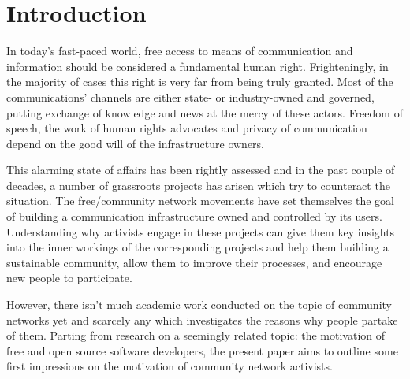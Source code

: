 \section{Introduction}

In today's fast-paced world, free access to means of communication and information should be considered a fundamental human right.
Frighteningly, in the majority of cases this right is very far from being truly granted.
Most of the communications' channels are either state- or industry-owned and governed, putting exchange of knowledge and news at the mercy of these actors.
Freedom of speech, the work of human rights advocates and privacy of communication depend on the good will of the infrastructure owners.

This alarming state of affairs has been rightly assessed and in the past couple of decades, a number of grassroots projects has arisen which try to counteract the situation.
The free/community network movements have set themselves the goal of building a communication infrastructure owned and controlled by its users.
Understanding why activists engage in these projects can give them key insights into the inner workings of the corresponding projects and help them building a sustainable community, allow them to improve their processes, and encourage new people to participate.

However, there isn't much academic work conducted on the topic of community networks yet and scarcely any which investigates the reasons why people partake of them.
Parting from research on a seemingly related topic: the motivation of free and open source software developers, the present paper aims to outline some first impressions on the motivation of community network activists.

\begin{comment}
* Untersuchungsgegenstand
* Erkenntnisinteresse
* Forschungsstand
* Ergebnisse können/sollen angedeuten werden

Why is the topic relevant??

* grassroots movements
* one of the free/open movements which is relatively understudied till now
* understanding why
  ** may enhance motivation and performance (or not);
  ** or give activists insights into how to improve their processes
\end{comment}


